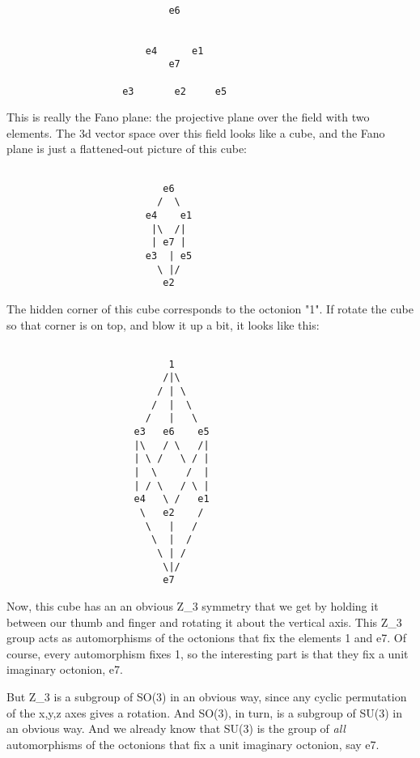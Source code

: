 \begin{verbatim}

                            e6

 
                        e4      e1
                            e7

                    e3       e2     e5
\end{verbatim}
    
This is really the Fano plane: the projective plane over the
field with two elements.  The 3d vector space over this field
looks like a cube, and the Fano plane is just a flattened-out
picture of this cube:
  

\begin{verbatim}

                           e6
                          /  \
                        e4    e1
                         |\  /| 
                         | e7 | 
                        e3  | e5
                          \ |/
                           e2     
\end{verbatim}
    
The hidden corner of this cube corresponds to the octonion "1". 
If rotate the cube so that corner is on top, and blow it up a bit,
it looks like this:


\begin{verbatim}

                            1
                           /|\
                          / | \
                         /  |  \         
                        /   |   \       
                      e3   e6    e5   
                      |\   / \   /| 
                      | \ /   \ / |
                      |  \     /  |
                      | / \   / \ |
                      e4   \ /   e1 
                       \   e2    / 
                        \   |   /                       
                         \  |  /
                          \ | /
                           \|/
                           e7
\end{verbatim}
    
Now, this cube has an an obvious Z_{3} symmetry that we get by
holding it between our thumb and finger and rotating it about 
the vertical axis.  This Z_{3} group acts as automorphisms
of the octonions that fix the elements 1 and e7.  Of course,
every automorphism fixes 1, so the interesting part is that
they fix a unit imaginary octonion, e7.  

But Z_{3} is a subgroup of SO(3) in an obvious way, since any 
cyclic permutation of the x,y,z axes gives a rotation.
And SO(3), in turn, is a subgroup of SU(3) in an obvious way. 
And we already know that SU(3) is the group of \emph{all} automorphisms 
of the octonions that fix a unit imaginary octonion, say e7.  

